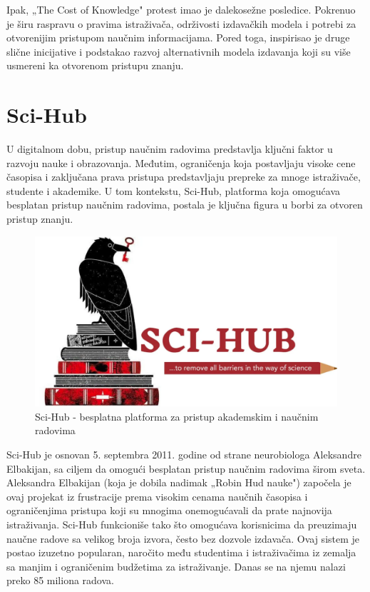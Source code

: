 \documentclass{article}
\begin{document}
Ipak, „The Cost of Knowledge" protest imao je dalekosežne posledice. Pokrenuo je širu raspravu o pravima istraživača, održivosti izdavačkih modela i potrebi za otvorenijim pristupom naučnim informacijama. Pored toga, inspirisao je druge slične inicijative i podstakao razvoj alternativnih modela izdavanja koji su više usmereni ka otvorenom pristupu znanju.


\section{Sci-Hub}

U digitalnom dobu, pristup naučnim radovima predstavlja ključni faktor u razvoju nauke i obrazovanja. Međutim, ograničenja koja postavljaju visoke cene časopisa i zaključana prava pristupa predstavljaju prepreke za mnoge istraživače, studente i akademike. U tom kontekstu, Sci-Hub, platforma koja omogućava besplatan pristup naučnim radovima, postala je ključna figura u borbi za otvoren pristup znanju.

\begin{figure}
    \centering
    \includegraphics[width=0.75\linewidth]{img/sci-hub.png}
    \caption{Sci-Hub - besplatna platforma za pristup akademskim i naučnim radovima}
\end{figure}

Sci-Hub je osnovan 5. septembra 2011. godine od strane neurobiologa Aleksandre Elbakijan, sa ciljem da omogući besplatan pristup naučnim radovima širom sveta. Aleksandra Elbakijan (koja je dobila nadimak „Robin Hud nauke") započela je ovaj projekat iz frustracije prema visokim cenama naučnih časopisa i ograničenjima pristupa koji su mnogima onemogućavali da prate najnovija istraživanja. Sci-Hub funkcioniše tako što omogućava korisnicima da preuzimaju naučne radove sa velikog broja izvora, često bez dozvole izdavača. Ovaj sistem je postao izuzetno popularan, naročito među studentima i istraživačima iz zemalja sa manjim i ograničenim budžetima za istraživanje. Danas se na njemu nalazi preko 85 miliona radova.
\end{document}
